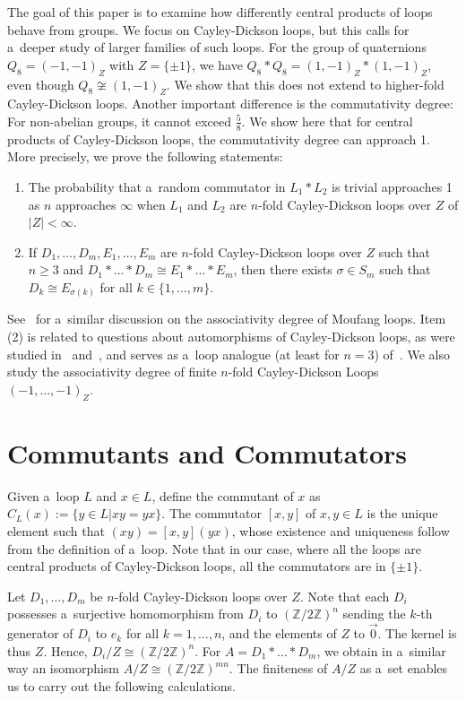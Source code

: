 \documentclass{jonasart}
\begin{document}
	The goal of this paper is to examine how differently central products of loops behave from groups. We focus on Cayley-Dickson loops, but this calls for a~deeper study of larger families of such loops. For the group of quaternions $Q_8 =(-1,-1)_Z$ with $Z=\{\pm 1\}$, we have $Q_8 \ast Q_8 =(1,-1)_Z \ast (1,-1)_Z$, even though $Q_8 \not \cong (1,-1)_{Z}$. We show that this does not extend to higher-fold Cayley-Dickson loops. Another important difference is the commutativity degree: For non-abelian groups, it cannot exceed $\frac{5}{8}$. We show here that for central products of Cayley-Dickson loops, the commutativity degree can approach 1. More precisely, we prove the following statements:
	\begin{enumerate}
		\item The probability that a~random commutator in $L_1 \ast L_2$ is trivial approaches 1 as $n$ approaches $\infty$ when $L_1$ and $L_2$ are $n$-fold Cayley-Dickson loops over $Z$ of $|Z|<\infty$.
		\item If $D_1,\dots,D_m,E_1,\dots,E_m$ are $n$-fold Cayley-Dickson loops over $Z$ such that $n \geqslant 3$ and $D_1\ast \dots \ast D_m \cong E_1 \ast \dots \ast E_m$, then there exists $\sigma \in S_m$ such that $D_k \cong E_{\sigma(k)}$ for all $k \in \{1,\dots,m\}$.
	\end{enumerate}
	See~\cite{Levin2025AssociativeMoufang} for a~similar discussion on the associativity degree of Moufang loops. Item (2) is related to questions about automorphisms of Cayley-Dickson loops, as were studied in~\cite{Kirshtein:2012} and~\cite{Chapman2024LoopsInvolutionCayleyDickson}, and serves as a~loop analogue (at least for $n = 3$) of~\cite{MPP}. We also study the associativity degree of finite $n$-fold Cayley-Dickson Loops $(-1,\dots,-1)_Z$.

	\section{Commutants and Commutators}

	Given a~loop $L$ and $x \in L$, define the commutant of $x$ as $C_L (x):= \{y\in L|xy=yx\}$. The commutator $[x,y]$ of $x,y \in L$ is the unique element such that $(xy) = [x,y](yx)$, whose existence and uniqueness follow from the definition of a~loop. Note that in our case, where all the loops are central products of Cayley-Dickson loops, all the commutators are in $\{\pm 1\}$.

	Let $D_1,\dots,D_m$ be $n$-fold Cayley-Dickson loops over $Z$. Note that each $D_i$ possesses a~surjective homomorphism from $D_i$ to $(\mathbb{Z}/2\mathbb{Z})^n$ sending the $k$-th generator of $D_i$ to $e_k$ for all $k = 1, \dots, n$, and the elements of $Z$ to $\vec{0}$. The kernel is thus $Z$. Hence, $D_i /Z\cong (\mathbb{Z}/2\mathbb{Z})^n$. For $A=D_1 \ast \dots \ast D_m$, we obtain in a~similar way an isomorphism $A/Z \cong (\mathbb{Z}/2\mathbb{Z})^{mn}$. The finiteness of $A/Z$ as a~set enables us to carry out the following calculations.
\end{document}
